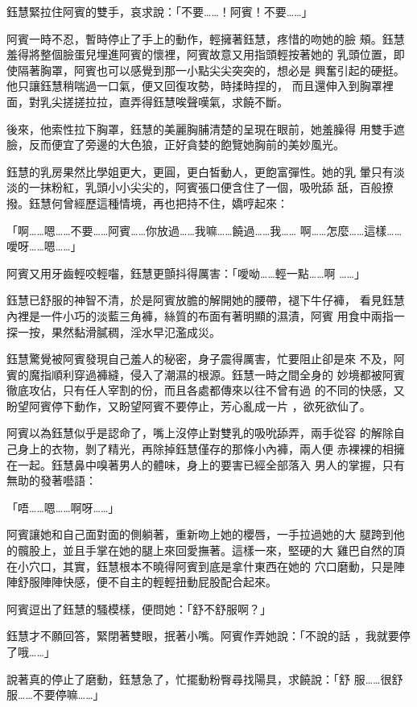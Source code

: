 鈺慧緊拉住阿賓的雙手，哀求說：「不要……！阿賓！不要……」

阿賓一時不忍，暫時停止了手上的動作，輕擁著鈺慧，疼惜的吻她的臉
頰。鈺慧羞得將整個臉蛋兒埋進阿賓的懷裡，阿賓故意又用指頭輕按著她的
乳頭位置，即使隔著胸罩，阿賓也可以感覺到那一小點尖尖突突的，想必是
興奮引起的硬挺。他只讓鈺慧稍喘過一口氣，便又回復攻勢，時揉時捏的，
而且還伸入到胸罩裡面，對乳尖搓搓拉拉，直弄得鈺慧唉聲嘆氣，求饒不斷。

後來，他索性拉下胸罩，鈺慧的美麗胸脯清楚的呈現在眼前，她羞臊得
用雙手遮臉，反而便宜了旁邊的大色狼，正好貪婪的飽覽她胸前的美妙風光。

鈺慧的乳房果然比學姐更大，更圓，更白皙動人，更飽富彈性。她的乳
暈只有淡淡的一抹粉紅，乳頭小小尖尖的，阿賓張口便含住了一個，吸吮舔
舐，百般撩撥。鈺慧何曾經歷這種情境，再也把持不住，嬌哼起來：

「啊……嗯……不要……阿賓……你放過……我嘛……饒過……我……
啊……怎麼……這樣……噯呀……嗯……」

阿賓又用牙齒輕咬輕囓，鈺慧更顫抖得厲害：「噯呦……輕一點……啊
……」

鈺慧已舒服的神智不清，於是阿賓放膽的解開她的腰帶，褪下牛仔褲，
看見鈺慧內裡是一件小巧的淡藍三角褲，絲質的布面有著明顯的濕漬，阿賓
用食中兩指一探一按，果然黏滑膩稠，淫水早氾濫成災。

鈺慧驚覺被阿賓發現自己羞人的秘密，身子震得厲害，忙要阻止卻是來
不及，阿賓的魔指順利穿過褲縫，侵入了潮濕的根源。鈺慧一時之間全身的
妙境都被阿賓徹底攻佔，只有任人宰割的份，而且各處都傳來以往不曾有過
的不同的快感，又盼望阿賓停下動作，又盼望阿賓不要停止，芳心亂成一片
，欲死欲仙了。

阿賓以為鈺慧似乎是認命了，嘴上沒停止對雙乳的吸吮舔弄，兩手從容
的解除自己身上的衣物，剝了精光，再除掉鈺慧僅存的那條小內褲，兩人便
赤裸裸的相擁在一起。鈺慧鼻中嗅著男人的體味，身上的要害已經全部落入
男人的掌握，只有無助的發著囈語：

「唔……嗯……啊呀……」

阿賓讓她和自己面對面的側躺著，重新吻上她的櫻唇，一手拉過她的大
腿跨到他的髖股上，並且手掌在她的腿上來回愛撫著。這樣一來，堅硬的大
雞巴自然的頂在小穴口，其實，鈺慧根本不曉得阿賓到底是拿什東西在她的
穴口磨動，只是陣陣舒服陣陣快感，便不自主的輕輕扭動屁股配合起來。

阿賓逗出了鈺慧的騷模樣，便問她：「舒不舒服啊？」

鈺慧才不願回答，緊閉著雙眼，抿著小嘴。阿賓作弄她說：「不說的話
，我就要停了哦……」

說著真的停止了磨動，鈺慧急了，忙擺動粉臀尋找陽具，求饒說：「舒
服……很舒服……不要停嘛……」

